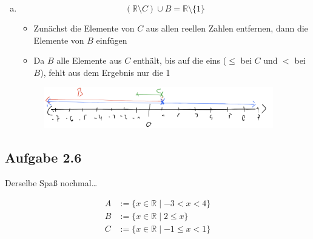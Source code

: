 \documentclass{standalone}
\begin{document}
\begin{enumerate}[a)]
    \item $$ (\mathbb{R} \setminus C) \cup B = \mathbb{R} \setminus \{1\} $$
    \begin{itemize}
        \item Zunächst die Elemente von $C$ aus allen reellen Zahlen entfernen, dann die Elemente von $B$ einfügen
        \item Da $B$ alle Elemente aus $C$ enthält, bis auf die eins ($\leq$ bei $C$ und $<$ bei $B$), fehlt aus dem Ergebnis nur die 1
    \end{itemize}
    \begin{figure}[htpb]
        \centering
        \includegraphics[width=10cm]{img/2_5_c}
    \end{figure}
    \FloatBarrier
\end{enumerate}

\subsection{Aufgabe 2.6}
Derselbe Spaß nochmal\dots

\begin{align}
    A&:=\{x \in \mathbb{R} \mid -3 < x < 4\} \\
    B&:=\{x \in \mathbb{R} \mid 2 \leq x\} \\
    C&:=\{x \in \mathbb{R} \mid -1 \leq x < 1\}
\end{align}
\end{document}
